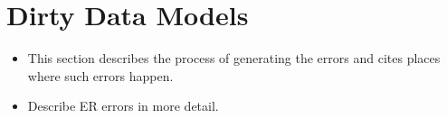 \section{Dirty Data Models}

\begin{itemize}
    \item This section describes the process of generating the errors and cites places where such errors happen.
    \item Describe ER errors in more detail.
\end{itemize}